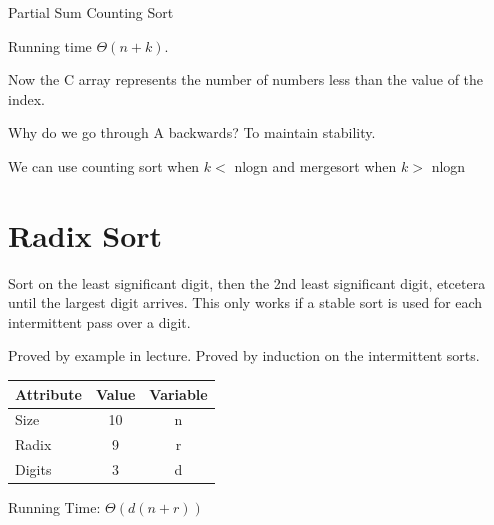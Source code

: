 \documentclass[english, 10pt]{article}
\begin{document}
\begin{algorithm}[H]
    \caption{Partial Sum Counting Sort}
\end{algorithm}

Running time $\Theta(n+k)$.

Now the C array represents the number of numbers less than the value of the index.

Why do we go through A backwards? To maintain stability.

We can use counting sort when $k <$ nlogn and mergesort when $k >$ nlogn



\section{Radix Sort}
Sort on the least significant digit, then the 2nd least significant digit,
etcetera until the largest digit arrives. This only works if a stable sort is
used for each intermittent pass over a digit.

Proved by example in lecture. Proved by induction on the intermittent sorts.

\begin{tabular}{lcc}
    Attribute & Value & Variable \\ \toprule
    Size      & 10    & n \\ \midrule
    Radix     & 9     & r \\ \midrule
    Digits    & 3     & d \\ \midrule
\end{tabular}

Running Time: $\Theta(d(n+r))$
\end{document}
